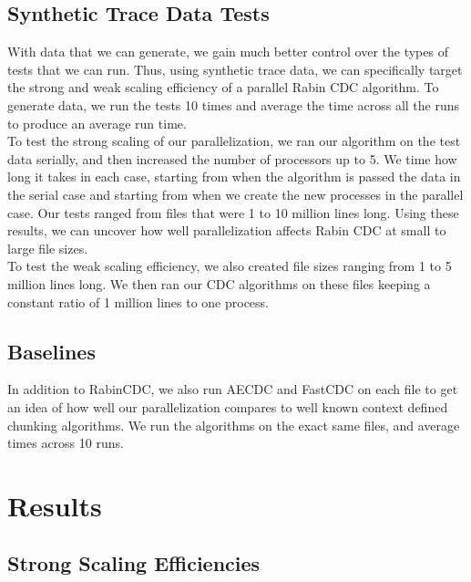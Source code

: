 \documentclass{acmtog} %
\begin{document}
	\subsection{Synthetic Trace Data Tests}
	With data that we can generate, we gain much better control over the types of tests that we can run. Thus, using synthetic trace data, we can specifically target the strong and weak scaling efficiency of a parallel Rabin CDC algorithm. To generate data, we run the tests 10 times and average the time across all the runs to produce an average run time. \\
	
	To test the strong scaling of our parallelization, we ran our algorithm on the test data serially, and then increased the number of processors up to 5. We time how long it takes in each case, starting from when the algorithm is passed the data in the serial case and starting from when we create the new processes in the parallel case. Our tests ranged from files that were 1 to 10 million lines long. Using these results, we can uncover how well parallelization affects Rabin CDC at small to large file sizes.\\
	
	To test the weak scaling efficiency, we also created file sizes ranging from 1 to 5 million lines long. We then ran our CDC algorithms on these files keeping a constant ratio of 1 million lines to one process. \\
	
	\subsection{Baselines}
	In addition to RabinCDC, we also run AECDC and FastCDC on each file to get an idea of how well our parallelization compares to well known context defined chunking algorithms. We run the algorithms on the exact same files, and average times across 10 runs.  
	
	\section{Results}
	\subsection{Strong Scaling Efficiencies}
\end{document}
